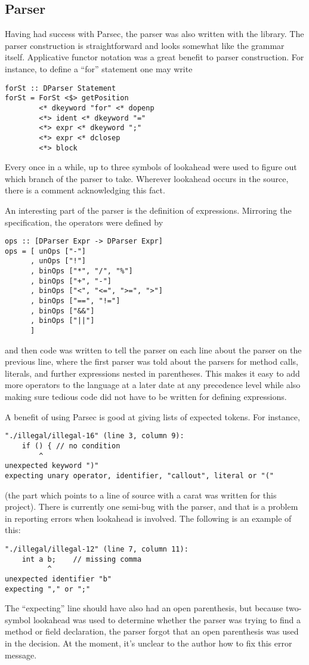 \documentclass[11pt]{article}
\begin{document}
\subsection{Parser}
\label{sec:parser}

Having had success with Parsec, the parser was also written with the
library.  The parser construction is straightforward and looks
somewhat like the grammar itself. Applicative functor notation was a
great benefit to parser construction.  For instance, to define a
``for'' statement one may write
\begin{verbatim}
forSt :: DParser Statement
forSt = ForSt <$> getPosition
        <* dkeyword "for" <* dopenp
        <*> ident <* dkeyword "="
        <*> expr <* dkeyword ";"
        <*> expr <* dclosep
        <*> block
\end{verbatim} %

Every once in a while, up to three symbols of lookahead were used to
figure out which branch of the parser to take.  Wherever lookahead
occurs in the source, there is a comment acknowledging this fact.

An interesting part of the parser is the definition of expressions.
Mirroring the specification, the operators were defined by
\begin{verbatim}
ops :: [DParser Expr -> DParser Expr]
ops = [ unOps ["-"]
      , unOps ["!"]
      , binOps ["*", "/", "%"]
      , binOps ["+", "-"]
      , binOps ["<", "<=", ">=", ">"]
      , binOps ["==", "!="]
      , binOps ["&&"]
      , binOps ["||"]
      ]
\end{verbatim}
and then code was written to tell the parser on each line about the
parser on the previous line, where the first parser was told about the
parsers for method calls, literals, and further expressions nested in
parentheses.  This makes it easy to add more operators to the language
at a later date at any precedence level while also making sure tedious
code did not have to be written for defining expressions.

A benefit of using Parsec is good at giving lists of expected tokens.
For instance,
\begin{verbatim}
"./illegal/illegal-16" (line 3, column 9):
    if () { // no condition
        ^
unexpected keyword ")"
expecting unary operator, identifier, "callout", literal or "("
\end{verbatim}
(the part which points to a line of source with a carat was written
for this project).  There is currently one semi-bug with the parser,
and that is a problem in reporting errors when lookahead is involved.
The following is an example of this:
\begin{verbatim}
"./illegal/illegal-12" (line 7, column 11):
    int a b;	// missing comma
          ^
unexpected identifier "b"
expecting "," or ";"
\end{verbatim}
The ``expecting'' line should have also had an open parenthesis, but
because two-symbol lookahead was used to determine whether the parser
was trying to find a method or field declaration, the parser forgot
that an open parenthesis was used in the decision.  At the moment,
it's unclear to the author how to fix this error message.
\end{document}
